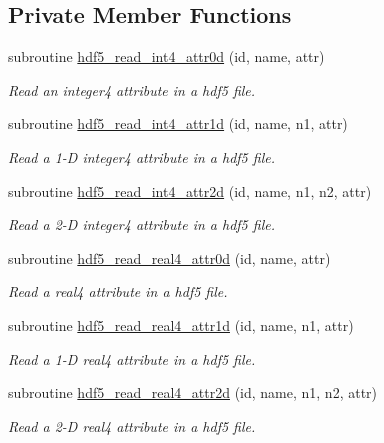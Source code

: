 \subsection*{Private Member Functions}
\begin{DoxyCompactItemize}
\item 
subroutine \hyperlink{interfacemodhdf5_1_1hdf5__read__attr_a8f911e83ea7fd98d6198490ba5fed12c}{hdf5\+\_\+read\+\_\+int4\+\_\+attr0d} (id, name, attr)
\begin{DoxyCompactList}\small\item\em Read an integer4 attribute in a hdf5 file. \end{DoxyCompactList}\item 
subroutine \hyperlink{interfacemodhdf5_1_1hdf5__read__attr_afa020293ebd3115b68cbe1fdfa312c4c}{hdf5\+\_\+read\+\_\+int4\+\_\+attr1d} (id, name, n1, attr)
\begin{DoxyCompactList}\small\item\em Read a 1-\/D integer4 attribute in a hdf5 file. \end{DoxyCompactList}\item 
subroutine \hyperlink{interfacemodhdf5_1_1hdf5__read__attr_a455abe5ff52b1fae1e547aebd0c94875}{hdf5\+\_\+read\+\_\+int4\+\_\+attr2d} (id, name, n1, n2, attr)
\begin{DoxyCompactList}\small\item\em Read a 2-\/D integer4 attribute in a hdf5 file. \end{DoxyCompactList}\item 
subroutine \hyperlink{interfacemodhdf5_1_1hdf5__read__attr_ae31cf266133a70be9c4eaa7853b48b19}{hdf5\+\_\+read\+\_\+real4\+\_\+attr0d} (id, name, attr)
\begin{DoxyCompactList}\small\item\em Read a real4 attribute in a hdf5 file. \end{DoxyCompactList}\item 
subroutine \hyperlink{interfacemodhdf5_1_1hdf5__read__attr_abf02aaadb611874adb1b0129be1c0d5c}{hdf5\+\_\+read\+\_\+real4\+\_\+attr1d} (id, name, n1, attr)
\begin{DoxyCompactList}\small\item\em Read a 1-\/D real4 attribute in a hdf5 file. \end{DoxyCompactList}\item 
subroutine \hyperlink{interfacemodhdf5_1_1hdf5__read__attr_a1c6f87720f189a2302ed117e27441c2e}{hdf5\+\_\+read\+\_\+real4\+\_\+attr2d} (id, name, n1, n2, attr)
\begin{DoxyCompactList}\small\item\em Read a 2-\/D real4 attribute in a hdf5 file. \end{DoxyCompactList}\item 

\end{DoxyCompactItemize}
